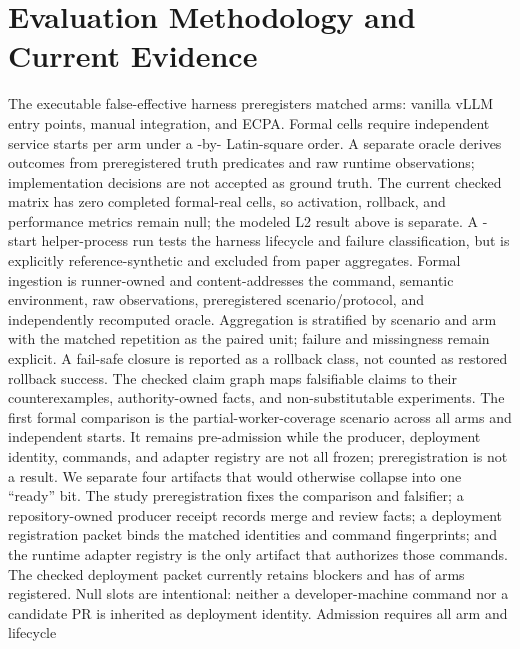 \documentclass[letterpaper,twocolumn,10pt]{article}
\begin{document}
\section{Evaluation Methodology and Current Evidence}
\label{sec:evaluation}
The executable false-effective harness preregisters \ECPAFormalArms{} matched arms:
vanilla vLLM entry points, manual integration, and ECPA.  Formal cells require
\ECPAMinimumStarts{} independent service starts per arm under a
\ECPAScheduleRows{}-by-\ECPAFormalArms{} Latin-square order.  A separate oracle
derives outcomes from preregistered truth predicates
and raw runtime observations; implementation decisions are not accepted as
ground truth.  The current checked matrix has zero completed formal-real cells,
so activation, rollback, and performance metrics remain null; the modeled L2
result above is separate.  A \ECPAReferenceStarts{}-start helper-process run tests the
harness lifecycle and failure classification, but is explicitly
reference-synthetic and excluded from paper aggregates.  Formal ingestion is
runner-owned and content-addresses the command, semantic environment, raw
observations, preregistered scenario/protocol, and independently recomputed
oracle.  Aggregation is stratified by scenario and arm with the matched
repetition as the paired unit; failure and missingness remain explicit.  A
fail-safe closure is reported as a rollback class, not counted as restored
rollback success.
The checked claim graph maps \ECPAResearchClaims{} falsifiable claims to their
counterexamples, authority-owned facts, and non-substitutable experiments.
The first formal comparison is the partial-worker-coverage scenario across all
\ECPAFormalArms{} arms and \ECPAFirstStudyStarts{} independent starts.  It
remains pre-admission while the producer, deployment identity, commands, and
adapter registry are not all frozen; preregistration is not a result.
We separate four artifacts that would otherwise collapse into one ``ready''
bit.  The study preregistration fixes the comparison and falsifier; a
repository-owned producer receipt records merge and review facts; a deployment
registration packet binds the matched identities and command fingerprints; and
the runtime adapter registry is the only artifact that authorizes those
commands.  The checked deployment packet currently retains
\ECPADeploymentBlockers{} blockers and has
\ECPARegisteredDeploymentArms{} of \ECPAFormalArms{} arms registered.  Null
slots are intentional: neither a developer-machine command nor a candidate PR
is inherited as deployment identity.  Admission requires all arm and lifecycle
\end{document}
